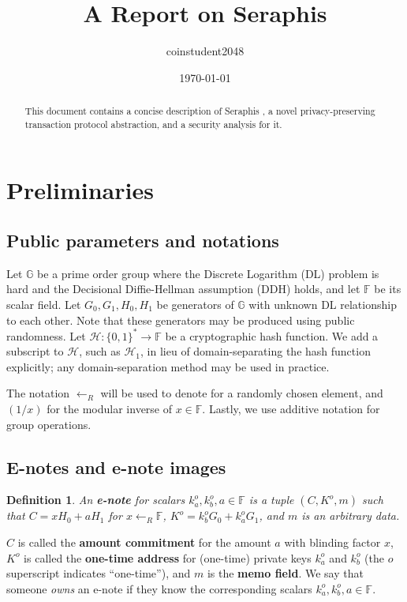 \documentclass{article}
\title{A Report on Seraphis}
\author{coinstudent2048}
\date{\today}
\newtheorem{definition}{Definition}[section]
\begin{document}
\maketitle

\begin{abstract}
This document contains a concise description of Seraphis \cite{seraphis}, a novel privacy-preserving transaction protocol abstraction, and a security analysis for it.
\end{abstract}

\section{Preliminaries}
\subsection{Public parameters and notations}
\noindent Let $\mathbb{G}$ be a prime order group where the Discrete Logarithm (DL) problem is hard and the Decisional Diffie-Hellman assumption (DDH) holds, and let $\mathbb{F}$ be its scalar field. Let $G_0, G_1, H_0, H_1$ be generators of $\mathbb{G}$ with unknown DL relationship to each other. Note that these generators may be produced using public randomness. Let $\mathcal{H}:\{0,1\}^*\rightarrow\mathbb{F}$ be a cryptographic hash function. We add a subscript to $\mathcal{H}$, such as $\mathcal{H}_1$, in lieu of domain-separating the hash function explicitly; any domain-separation method may be used in practice.

The notation $\leftarrow_R$ will be used to denote for a randomly chosen element, and $(1/x)$ for the modular inverse of $x\in\mathbb{F}$. Lastly, we use additive notation for group operations.

\subsection{E-notes and e-note images}
\begin{definition}\label{e-note}
An \textbf{\em e-note} for scalars $k_a^o, k_b^o, a \in\mathbb{F}$ is a tuple $(C, K^o, m)$ such that $C=xH_0+aH_1$ for $x\leftarrow_R\mathbb{F}$, $K^o=k_b^o G_0 + k_a^o G_1$, and $m$ is an arbitrary data.
\end{definition}
$C$ is called the \textbf{amount commitment} for the amount $a$ with blinding factor $x$, $K^o$ is called the \textbf{one-time address} for (one-time) private keys $k_a^o$ and $k_b^o$ (the $o$ superscript indicates ``one-time''), and $m$ is the \textbf{memo field}. We say that someone \textit{owns} an e-note if they know the corresponding scalars $k_a^o, k_b^o, a \in\mathbb{F}$.
\end{document}
